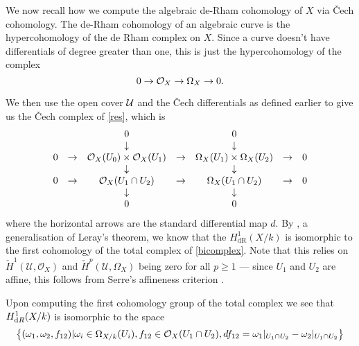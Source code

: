\documentclass[draft, 11pt]{article} %
\theoremstyle{plain}
\theoremstyle{remark}
\newcommand{\cO}{{\cal O}}
\newcommand{\cU}{{\mathcal U}}
\newcommand{\cech}{\v{C}ech }
\newcommand{\cechhone}{\check{H}^1(\mathcal U,\mathcal O_X)}
\newcommand{\derhamhone}{H_{\text {dR}}^1(X/k)}
\begin{document}
We now recall how we compute the algebraic de-Rham cohomology of $X$ via \cech cohomology.
The de-Rham cohomology of an algebraic curve is the hypercohomology of the de Rham complex on $X$. 
Since a curve doesn't have differentials of degree greater than one, this is just the hypercohomology of the complex
\begin{equation}\label{res}
0 \rightarrow \cO_X \rightarrow \Omega_X \rightarrow 0.
\end{equation}

We then use the open cover $\cal U$ and the \cech differentials as defined earlier to give us the \cech complex of \eqref{res}, which is
\begin{equation}\label{bicomplex} \begin{array}{ccccccc}
~ & ~ & 0 & ~ & 0 & ~ & ~ \\
~ & ~ & \downarrow & ~ & \downarrow & ~ & ~ \\
0 & \rightarrow & \cO_X(U_0)\times \cO_X(U_1) & \rightarrow & \Omega_X(U_1)\times \Omega_X(U_2) & \rightarrow & 0 \\
~ & ~ & \downarrow & ~ & \downarrow & ~ & ~ \\
0 & \rightarrow & \cO_X(U_1 \cap U_2) & \rightarrow & \Omega_X(U_1 \cap U_2) & \rightarrow & 0 \\
~ & ~ & \downarrow & ~ & \downarrow & ~ & ~ \\
~ & ~ & 0 & ~ & 0 & ~ & ~ \\
\end{array}
\end{equation}
where the horizontal arrows are the standard differential map $d$.
By \cite[Cor. 12.4.7]{EGA0III}, a generalisation of Leray's theorem, we know that the $\derhamhone$ is isomorphic to the first cohomology of the total complex of \eqref{bicomplex}.
Note that this relies on $\cechhone$ and ${\check H}^p(\cU, \Omega_X)$ being zero for all $p\geq 1$ ---
since $U_1$ and $U_2$ are affine, this follows from Serre's affineness criterion \cite[Thm 5.2.23]{liu}.



Upon computing the first cohomology group of the total complex we see that $H^1_{{\text dR}}(X/k)$ is isomorphic to the space
\begin{equation}\label{derhamconditions}
\left\{(\omega_1, \omega_2, f_{12}) | \omega_i\in \Omega_{X/k}(U_i), f_{12}\in \cO_X(U_1 \cap U_2), df_{12} = \omega_1|_{U_1\cap U_2} - \omega_2|_{U_1\cap U_2} \right\}
\end{equation}
\end{document}
